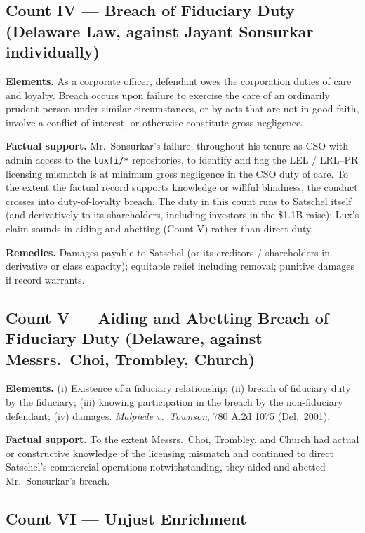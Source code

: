 \documentclass[11pt,letterpaper]{article}
\begin{document}
\subsection*{Count IV --- Breach of Fiduciary Duty (Delaware Law,
against Jayant Sonsurkar individually)}

\textbf{Elements.} As a corporate officer, defendant owes the
corporation duties of care and loyalty. Breach occurs upon failure to
exercise the care of an ordinarily prudent person under similar
circumstances, or by acts that are not in good faith, involve a
conflict of interest, or otherwise constitute gross negligence.

\textbf{Factual support.} Mr.\ Sonsurkar's failure, throughout his
tenure as CSO with admin access to the \texttt{luxfi/*} repositories,
to identify and flag the LEL / LRL--PR licensing mismatch is at
minimum gross negligence in the CSO duty of care. To the extent the
factual record supports knowledge or willful blindness, the conduct
crosses into duty-of-loyalty breach. The duty in this count runs
to Satschel itself (and derivatively to its shareholders, including
investors in the \$1.1B raise); Lux's claim sounds in aiding and
abetting (Count V) rather than direct duty.

\textbf{Remedies.} Damages payable to Satschel (or its creditors /
shareholders in derivative or class capacity); equitable relief
including removal; punitive damages if record warrants.

\subsection*{Count V --- Aiding and Abetting Breach of Fiduciary
Duty (Delaware, against Messrs.\ Choi, Trombley, Church)}

\textbf{Elements.} (i) Existence of a fiduciary relationship; (ii)
breach of fiduciary duty by the fiduciary; (iii) knowing participation
in the breach by the non-fiduciary defendant; (iv) damages.
\emph{Malpiede v.\ Townson}, 780 A.2d 1075 (Del.\ 2001).

\textbf{Factual support.} To the extent Messrs.\ Choi, Trombley, and
Church had actual or constructive knowledge of the licensing mismatch
and continued to direct Satschel's commercial operations notwithstanding,
they aided and abetted Mr.\ Sonsurkar's breach.

\subsection*{Count VI --- Unjust Enrichment}
\end{document}
